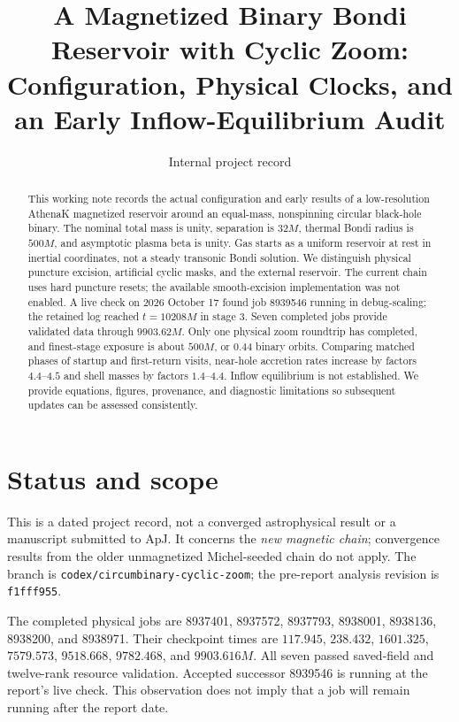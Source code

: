 \documentclass[twocolumn,anonymous]{aastex701}
\begin{document}
\title{A Magnetized Binary Bondi Reservoir with Cyclic Zoom:\\Configuration, Physical Clocks, and an Early Inflow-Equilibrium Audit}
\author{Internal project record}
\begin{abstract}
This working note records the actual configuration and early results of a low-resolution AthenaK magnetized reservoir around an equal-mass, nonspinning circular black-hole binary. The nominal total mass is unity, separation is $32M$, thermal Bondi radius is $500M$, and asymptotic plasma beta is unity. Gas starts as a uniform reservoir at rest in inertial coordinates, not a steady transonic Bondi solution. We distinguish physical puncture excision, artificial cyclic masks, and the external reservoir. The current chain uses hard puncture resets; the available smooth-excision implementation was not enabled. A live check on 2026 October 17 found job 8939546 running in debug-scaling; the retained log reached $t=10208M$ in stage 3. Seven completed jobs provide validated data through $9903.62M$. Only one physical zoom roundtrip has completed, and finest-stage exposure is about $500M$, or $0.44$ binary orbits. Comparing matched phases of startup and first-return visits, near-hole accretion rates increase by factors $4.4$--$4.5$ and shell masses by factors $1.4$--$4.4$. Inflow equilibrium is not established. We provide equations, figures, provenance, and diagnostic limitations so subsequent updates can be assessed consistently.
\end{abstract}

\section{Status and scope}\label{sec:status}
This is a dated project record, not a converged astrophysical result or a manuscript submitted to ApJ. It concerns the \emph{new magnetic chain}; convergence results from the older unmagnetized Michel-seeded chain do not apply. The branch is \texttt{codex/circumbinary-cyclic-zoom}; the pre-report analysis revision is \texttt{f1fff955}.

The completed physical jobs are 8937401, 8937572, 8937793, 8938001, 8938136, 8938200, and 8938971. Their checkpoint times are $117.945$, $238.432$, $1601.325$, $7579.573$, $9518.668$, $9782.468$, and $9903.616M$. All seven passed saved-field and twelve-rank resource validation. Accepted successor 8939546 is running at the report's live check. This observation does not imply that a job will remain running after the report date.
\end{document}
